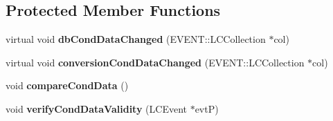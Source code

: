\subsection*{Protected Member Functions}
\begin{DoxyCompactItemize}
\item 
virtual void {\bfseries db\-Cond\-Data\-Changed} (E\-V\-E\-N\-T\-::\-L\-C\-Collection $\ast$col)\label{classTestCondDataProcessor_a11d117de5b81da6e3246171f56d78d08}

\item 
virtual void {\bfseries conversion\-Cond\-Data\-Changed} (E\-V\-E\-N\-T\-::\-L\-C\-Collection $\ast$col)\label{classTestCondDataProcessor_a2fc2e10fcae642399e67708808dba688}

\item 
void {\bfseries compare\-Cond\-Data} ()\label{classTestCondDataProcessor_a0b664c9a1fed4642636cba44a3d98947}

\item 
void {\bfseries verify\-Cond\-Data\-Validity} (L\-C\-Event $\ast$evt\-P)\label{classTestCondDataProcessor_ae0539d5334c95c21a9e6a8df40db6993}

\end{DoxyCompactItemize}
